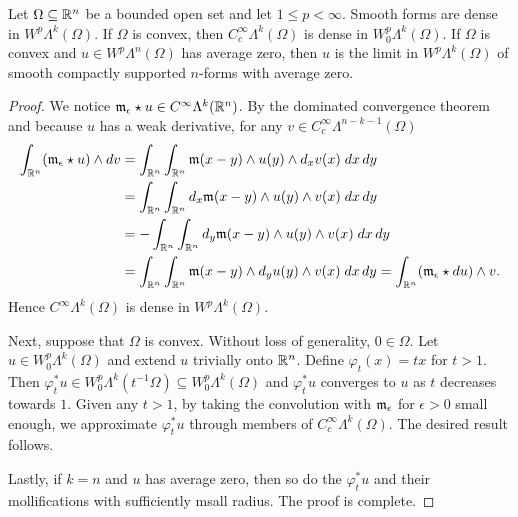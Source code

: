\documentclass[10pt,a4paper]{article}
\newcommand{\mwl}[1]{{\color{red}#1}}
\begin{document}
\begin{lemma}
    Let $\Omega \subseteq {\mathbb R}^{n}$ be a bounded open set and let $1 \leq p < \infty$. 
    Smooth forms are dense in $W^{p}\Lambda^{k}(\Omega)$.
    If $\Omega$ is convex, then $C^{\infty}_{c}\Lambda^{k}(\Omega)$ is dense in $W^{p}_{0}\Lambda^{k}(\Omega)$. 
	\mwl{If $\Omega$ is convex and $u \in W^{p}\Lambda^{n}(\Omega)$ has average zero, 
	then $u$ is the limit in $W^{p}\Lambda^{k}(\Omega)$ of smooth compactly supported $n$-forms with average zero.}
\end{lemma}
\begin{proof}
    We notice ${\mathfrak m}_{\epsilon} \star u \in C^{\infty}\Lambda^{k}({\mathbb R}^{n})$. 
    By the dominated convergence theorem and because $u$ has a weak derivative,
    for any $v \in C^{\infty}_{c}\Lambda^{n-k-1}(\Omega)$
    \begin{align*}
        \int_{{\mathbb R}^{n}} ( {\mathfrak m}_{\epsilon} \star u ) \wedge d v 
        &= 
        \int_{{\mathbb R}^{n}} \int_{{\mathbb R}^{n}} {\mathfrak m}(x-y) \wedge u(y) \wedge d_{x} v(x) \;dx\,dy
        \\&= 
        \int_{{\mathbb R}^{n}} \int_{{\mathbb R}^{n}} d_x{\mathfrak m}(x-y) \wedge u(y) \wedge v(x) \;dx\,dy
        \\&= 
        - \int_{{\mathbb R}^{n}} \int_{{\mathbb R}^{n}} d_y{\mathfrak m}(x-y) \wedge u(y) \wedge v(x) \;dx\,dy
        \\&= 
        \int_{{\mathbb R}^{n}} \int_{{\mathbb R}^{n}} {\mathfrak m}(x-y) \wedge d_y u(y) \wedge v(x) \;dx\,dy
        = 
        \int_{{\mathbb R}^{n}} ( {\mathfrak m}_{\epsilon} \star d u ) \wedge v 
        .
    \end{align*}
    Hence $C^{\infty}\Lambda^{k}(\Omega)$ is dense in $W^{p}\Lambda^{k}(\Omega)$.
    
    Next, suppose that $\Omega$ is convex. Without loss of generality, $0 \in \Omega$. 
    Let $u \in W^{p}_{0}\Lambda^{k}(\Omega)$ and extend $u$ trivially onto ${\mathbb R}^{n}$. 
    Define $\varphi_t(x) = tx$ for $t > 1$. 
    Then $\varphi_{t}^{\ast} u \in W^{p}_{0}\Lambda^{k}(t^{-1}\Omega) \subseteq W^{p}_{0}\Lambda^{k}(\Omega)$ 
    and $\varphi_{t}^{\ast} u$ converges to $u$ as $t$ decreases towards $1$. 
    Given any $t > 1$, by taking the convolution with ${\mathfrak m}_{\epsilon}$ for $\epsilon > 0$ small enough,
    we approximate $\varphi_{t}^{\ast} u$ through members of $C^{\infty}_{c}\Lambda^{k}(\Omega)$.
    The desired result follows. 
	
	Lastly, if $k = n$ and $u$ has average zero, then so do the $\varphi_{t}^{\ast} u$ and their mollifications with sufficiently msall radius. The proof is complete. 
\end{proof}
\end{document}
